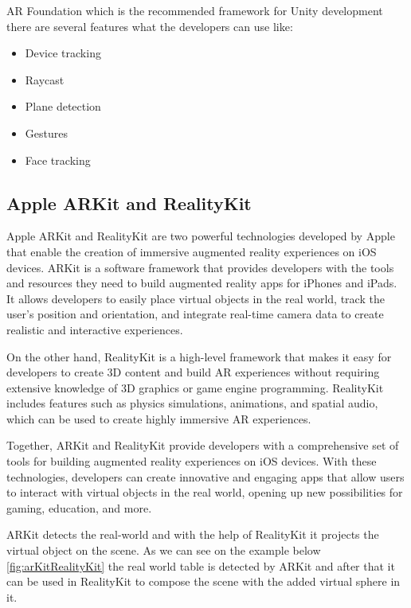 \documentclass[a4paper,oneside]{article}
\begin{document}
AR Foundation which is the recommended framework for Unity development there are several features what the developers can use like:
\begin{itemize}
  \item Device tracking
  \item Raycast
  \item Plane detection
  \item Gestures
  \item Face tracking
\end{itemize}

\subsection{Apple ARKit and RealityKit}

Apple ARKit \cite{appleArKit} and RealityKit \cite{appleArRealityKit} are two powerful technologies developed by Apple that enable the creation of immersive augmented reality experiences on iOS devices. ARKit is a software framework that provides developers with the tools and resources they need to build augmented reality apps for iPhones and iPads. It allows developers to easily place virtual objects in the real world, track the user's position and orientation, and integrate real-time camera data to create realistic and interactive experiences.

On the other hand, RealityKit is a high-level framework that makes it easy for developers to create 3D content and build AR experiences without requiring extensive knowledge of 3D graphics or game engine programming. RealityKit includes features such as physics simulations, animations, and spatial audio, which can be used to create highly immersive AR experiences.

Together, ARKit and RealityKit provide developers with a comprehensive set of tools for building augmented reality experiences on iOS devices. With these technologies, developers can create innovative and engaging apps that allow users to interact with virtual objects in the real world, opening up new possibilities for gaming, education, and more.

ARKit detects the real-world and with the help of RealityKit it projects the virtual object on the scene. As we can see on the example below \ref{fig:arKitRealityKit} the real world table is detected by ARKit and after that it can be used in RealityKit to compose the scene with the added virtual sphere in it.
\end{document}
